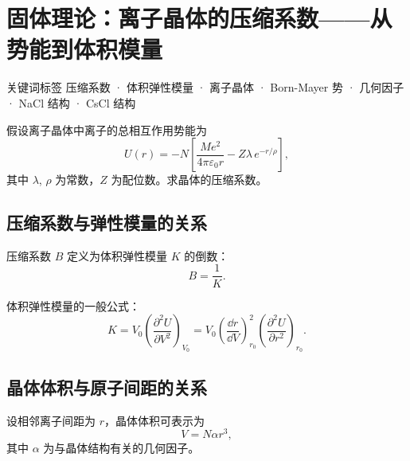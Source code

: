 \section{固体理论：离子晶体的压缩系数——从势能到体积模量}
\label{sec:compressibility}

\begin{tipbox}{关键词标签}
压缩系数 · 体积弹性模量 · 离子晶体 · Born-Mayer 势 · 几何因子 · NaCl 结构 · CsCl 结构
\end{tipbox}

\begin{modelbox}
假设离子晶体中离子的总相互作用势能为
\[
  U(r) = -N\left[\frac{Me^2}{4\pi\varepsilon_0 r} - Z\lambda\,e^{-r/\rho}\right],
\]
其中 $\lambda$, $\rho$ 为常数，$Z$ 为配位数。求晶体的压缩系数。
\end{modelbox}

\subsection{压缩系数与弹性模量的关系}

压缩系数 $B$ 定义为体积弹性模量 $K$ 的倒数：
\[
  B = \frac{1}{K}.
\]

体积弹性模量的一般公式：
\[
  K = V_0\left(\frac{\partial^2 U}{\partial V^2}\right)_{V_0}
    = V_0\left(\frac{\dd r}{\dd V}\right)^2_{r_0}
      \left(\frac{\partial^2 U}{\partial r^2}\right)_{r_0}. \tag{1}
\]

\subsection{晶体体积与原子间距的关系}

设相邻离子间距为 $r$，晶体体积可表示为
\[
  V = N\alpha r^3,
\]
其中 $\alpha$ 为与晶体结构有关的几何因子。

